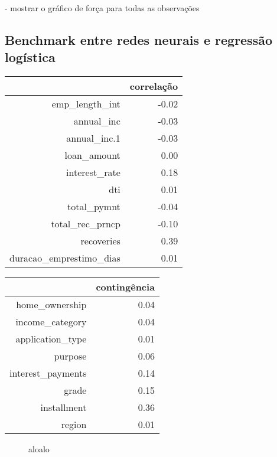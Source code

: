 - mostrar o gráfico de força para todas as observações

\subsection*{Benchmark entre redes neurais e regressão logística}

\begin{table}[ht]
\centering
\begin{tabular}{rr}
  \hline
 & correlação \\ 
  \hline
emp\_length\_int & -0.02 \\ 
  annual\_inc & -0.03 \\ 
  annual\_inc.1 & -0.03 \\ 
  loan\_amount & 0.00 \\ 
  interest\_rate & 0.18 \\ 
  dti & 0.01 \\ 
  total\_pymnt & -0.04 \\ 
  total\_rec\_prncp & -0.10 \\ 
  recoveries & 0.39 \\ 
  duracao\_emprestimo\_dias & 0.01 \\ 
   \hline
\end{tabular}
\end{table}

\begin{table}[ht]
\centering
\begin{tabular}{rr}
  \hline
 & contingência \\ 
  \hline
home\_ownership & 0.04 \\ 
  income\_category & 0.04 \\ 
  application\_type & 0.01 \\ 
  purpose & 0.06 \\ 
  interest\_payments & 0.14 \\ 
  grade & 0.15 \\ 
  installment & 0.36 \\ 
  region & 0.01 \\ 
   \hline
\end{tabular}
\end{table}


\begin{figure}
  \centering
  \vspace{.5cm}
  \vspace{.5cm}
  
  \label{fig:enter-label}
  \caption{aloalo}
\end{figure}

